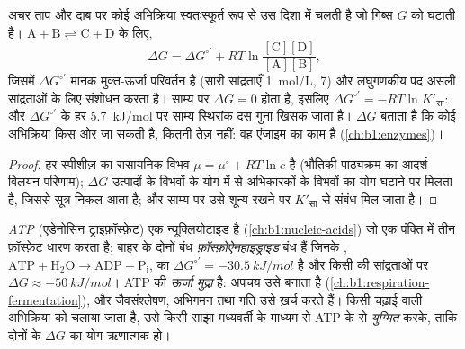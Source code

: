 \begin{proposition}[किसी अभिक्रिया की मुक्त ऊर्जा]\label{prop:b1:water-small-molecules:gibbs}
अचर ताप और दाब पर कोई अभिक्रिया स्वतःस्फूर्त रूप से उस दिशा में चलती है
जो गिब्स  $G$ को घटाती है।
$\mathrm{A} + \mathrm{B} \rightleftharpoons \mathrm{C} + \mathrm{D}$ के लिए,
\[
\Delta G = \Delta G^{\circ\prime} + RT\ln\frac{[\mathrm{C}][\mathrm{D}]}{[\mathrm{A}][\mathrm{B}]},
\]
जिसमें $\Delta G^{\circ\prime}$ मानक मुक्त-ऊर्जा परिवर्तन है
(सारी सांद्रताएँ \qty{1}{mol/L},  7) और लघुगणकीय पद असली सांद्रताओं के
लिए संशोधन करता है। साम्य पर $\Delta G = 0$ होता है, इसलिए
$\Delta G^{\circ\prime} = -RT\ln K'_{\text{सा}}$: और
$\Delta G^{\circ\prime}$ के हर \qty{5.7}{kJ/mol} पर साम्य स्थिरांक दस
गुना खिसक जाता है। $\Delta G$ बताता है कि कोई अभिक्रिया किस ओर जा सकती
है, कितनी तेज़ नहीं: वह एंजाइम का काम है (\cref{ch:b1:enzymes})।
\end{proposition}
\begin{proof}
हर स्पीशीज़ का रासायनिक विभव $\mu = \mu^\circ + RT\ln c$ है
(भौतिकी पाठ्यक्रम का आदर्श-विलयन परिणाम); $\Delta G$ उत्पादों के विभवों
के योग में से अभिकारकों के विभवों का योग घटाने पर मिलता है, जिससे सूत्र
निकल आता है; और साम्य पर उसे शून्य रखने पर $K'_{\text{सा}}$ से संबंध मिल
जाता है।
\end{proof}

\begin{definition}[ATP, युग्मन]\label{def:b1:water-small-molecules:atp}
\emph{ATP} (एडेनोसिन ट्राइफ़ॉस्फ़ेट) एक न्यूक्लियोटाइड है
(\cref{ch:b1:nucleic-acids}) जो एक पंक्ति में तीन फ़ॉस्फ़ेट धारण करता
है; बाहर के दोनों बंध \emph{फ़ॉस्फ़ोऐनहाइड्राइड}
बंध हैं जिनके , $\mathrm{ATP} + \mathrm{H_2O} \to \mathrm{ADP} +
\mathrm{P_i}$, का $\Delta G^{\circ\prime} = \qty{-30.5}{kJ/mol}$ है और
किसी  की सांद्रताओं पर $\Delta G \approx \qty{-50}{kJ/mol}$।
ATP  की \emph{ऊर्जा मुद्रा} है:
अपचय उसे बनाता है (\cref{ch:b1:respiration-fermentation}), और
जैवसंश्लेषण, अभिगमन तथा गति उसे ख़र्च करते हैं। किसी चढ़ाई वाली
अभिक्रिया को चलाया जाता है, उसे किसी साझा मध्यवर्ती के माध्यम से ATP के
 से \emph{युग्मित} करके, ताकि दोनों के
$\Delta G$ का योग ऋणात्मक हो।
\end{definition}


